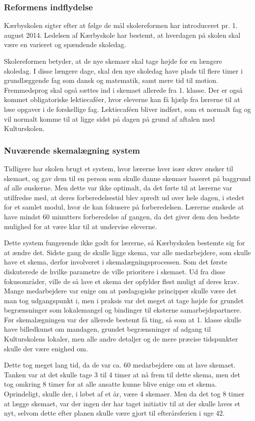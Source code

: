 \subsubsection{Reformens indflydelse}
\label{Reformens_indflydelse}
Kærbyskolen sigter efter at følge de mål skolereformen har introduceret pr. 1. august 2014. Ledelsen af Kærbyskole har bestemt, at hverdagen på skolen skal være en varieret og spændende skoledag.

Skolereformen betyder, at de nye skemaer skal tage højde for en længere skoledag. I disse længere dage, skal den nye skoledag have plads til flere timer i grundlæggende fag som dansk og matematik, samt mere tid til motion. Fremmedsprog skal også sættes ind i skemaet allerede fra 1. klasse. Der er også kommet obligatoriske lektiecaf\'eer, hvor eleverne kan få hjælp fra lærerne til at løse opgaver i de forskellige fag. Lektiecaf\'een bliver indført, som et normalt fag og vil normalt komme til at ligge sidst på dagen på grund af aftalen med Kulturskolen\cite{kaerby_skolereform}.

\subsubsection {Nuværende skemalægning system}
Tidligere har skolen brugt et system, hvor lærerne hver især skrev ønsker til skemaet, og gav dem til en person som skulle danne skemaer baseret på baggrund af alle ønskerne. Men dette var ikke optimalt, da det førte til at lærerne var utilfredse med, at deres forberedelsestid blev spredt ud over hele dagen, i stedet for et samlet modul, hvor de kan fokusere på forberedelsen\cite{interview_Kaerby}. Lærerne ønskede at have mindst 60 minutters forberedelse af gangen, da det giver dem den bedste mulighed for at være klar til at undervise eleverne.

Dette system fungerende ikke godt for lærerne, så Kærbyskolen bestemte sig for at ændre det. Sidste gang de skulle ligge skema, var alle medarbejdere, som skulle have et skema, derfor involveret i skemalægningsprocessen. Som det første diskuterede de hvilke parametre de ville prioritere i skemaet. Ud fra disse fokusområder, ville de så lave et skema der opfylder flest muligt af deres krav. Mange medarbejdere var enige om at pædagogiske principper skulle være det man tog udgangspunkt i, men i praksis var det meget at tage højde for grundet begrænsninger som lokalemangel og bindinger til eksterne samarbejdspartnere. Før skemalægningen var der allerede bestemt få ting, så som at 1. klasse skulle have billedkunst om mandagen, grundet begrænsninger af adgang til Kulturskolens lokaler, men alle andre detaljer og de mere præcise tidspunkter skulle der være enighed om. 

Dette tog meget lang tid, da de var ca. 60 medarbejdere om at lave skemaet. Tanken var at det skulle tage 3 til 4 timer at nå frem til dette skema, men det tog omkring 8 timer for at alle ansatte kunne blive enige om et skema. Oprindeligt, skulle der, i løbet af et år, være 4 skemaer. Men da det tog 8 timer at lægge skemaet, var der ingen der har taget initiativ til at der skulle laves et nyt, selvom dette efter planen skulle være gjort til efterårsferien i uge 42. 



